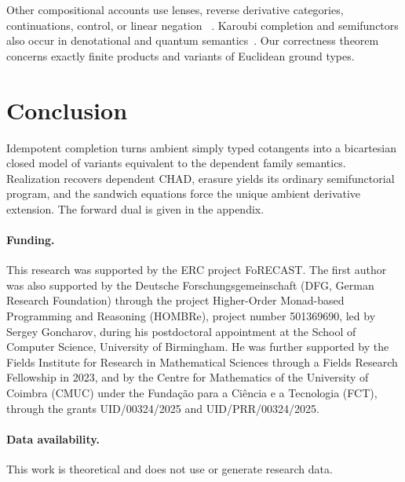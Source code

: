 \documentclass[runningheads,envcountsame]{llncs}
\begin{document}
Other compositional accounts use lenses, reverse derivative categories,
continuations, control, or linear negation
~\cite{JohnsonRosebrughWood2012,FongSpivakTuyeras2019,CockettEtAl2020,CruttwellEtAl2022,PearlmutterSiskind2008,WangEtAl2019,BrunelMazzaPagani2020}.
Karoubi completion and semifunctors also occur in denotational and quantum
semantics~\cite{Scott1976,Hayashi1985,Hoofman1993,HoofmanMoerdijk1995,Selinger2008}.
Our correctness theorem concerns exactly finite products and variants of
Euclidean ground types.

\section{Conclusion}
\label{sec:conclusion}

Idempotent completion turns ambient simply typed cotangents into a bicartesian
closed model of variants equivalent to the dependent family semantics.
Realization recovers dependent CHAD, erasure yields its ordinary semifunctorial
program, and the sandwich equations force the unique ambient derivative
extension. The forward dual is given in the appendix.

\paragraph{Funding.}
This research was supported by the ERC project FoRECAST. The first author was
also supported by the Deutsche Forschungsgemeinschaft (DFG, German Research
Foundation) through the project Higher-Order Monad-based Programming and
Reasoning (HOMBRe), project number 501369690, led by Sergey Goncharov, during
his postdoctoral appointment at the School of Computer Science, University of
Birmingham. He was further supported by the Fields Institute for Research in
Mathematical Sciences through a Fields Research Fellowship in 2023, and by the
Centre for Mathematics of the University of Coimbra (CMUC) under the
Funda\c{c}\~ao para a Ci\^encia e a Tecnologia (FCT), through the grants
UID/00324/2025 and UID/PRR/00324/2025.

\paragraph{Data availability.}
This work is theoretical and does not use or generate research data.




\clearpage
\appendix
{}
\renewcommand*{\theHsection}{app.\Alph{section}}
\renewcommand*{\theHsubsection}{app.\Alph{section}.\arabic{subsection}}
\end{document}
